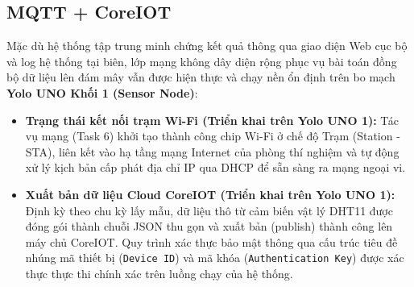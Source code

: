 \subsection{MQTT + CoreIOT}
Mặc dù hệ thống tập trung minh chứng kết quả thông qua giao diện Web cục bộ và log hệ thống tại biên, lớp mạng không dây diện rộng phục vụ bài toán đồng bộ dữ liệu lên đám mây vẫn được hiện thực và chạy nền ổn định trên bo mạch \textbf{Yolo UNO Khối 1 (Sensor Node)}:
\begin{itemize}
    \item \textbf{Trạng thái kết nối trạm Wi-Fi (Triển khai trên Yolo UNO 1):} Tác vụ mạng (Task 6) khởi tạo thành công chip Wi-Fi ở chế độ Trạm (Station - STA), liên kết vào hạ tầng mạng Internet của phòng thí nghiệm và tự động xử lý kịch bản cấp phát địa chỉ IP qua DHCP để sẵn sàng ra mạng ngoại vi.
    \item \textbf{Xuất bản dữ liệu Cloud CoreIOT (Triển khai trên Yolo UNO 1):} Định kỳ theo chu kỳ lấy mẫu, dữ liệu thô từ cảm biến vật lý DHT11 được đóng gói thành chuỗi JSON thu gọn và xuất bản (publish) thành công lên máy chủ CoreIOT. Quy trình xác thực bảo mật thông qua cấu trúc tiêu đề nhúng mã thiết bị (\texttt{Device ID}) và mã khóa (\texttt{Authentication Key}) được xác thực thực thi chính xác trên luồng chạy của hệ thống.
\end{itemize}

